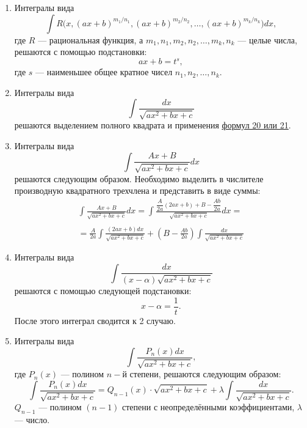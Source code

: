 \documentclass[a4paper,12pt,oneside]{extbook}
\theoremstyle{numbered}
\theoremstyle{unnumbered}
\theoremstyle{named}
\theoremstyle{unnumbered}
\theoremstyle{named}
\theoremstyle{named}
\theoremstyle{named}
\newcommand{\plink}[2]{\hyperref[#1]{\color{blue}\underline{#2}}}
\begin{document}
\begin{enumerate}
    \item {
          Интегралы вида
          \[
              \int R\Big(x, (ax + b)^{m_1 / n_1}, (ax + b)^{m_2 / n_2}, \ldots, (ax + b)^{m_k / n_k}\Big) dx,
          \]
          где \(R\) — рациональная функция, а \(m_1, n_1, m_2, n_2, \ldots, m_k, n_k\) — целые числа, решаются с помощью подстановки:
          \[
              ax + b = t^s,
          \]
          где \(s\) — наименьшее общее кратное чисел \(n_1, n_2, \ldots, n_k\).
          }
    \item {
          Интегралы вида
          \[
              \int \frac{dx}{\sqrt{ax^2 + bx + c}}
          \]
          решаются выделением полного квадрата и применения \plink{sub:Таблица основных интегралов}{формул 20 или 21}.
          }
    \item {
          Интегралы вида
          \[
              \int \frac{Ax + B}{\sqrt{ax^2 + bx + c}}dx
          \]
          решаются следующим образом. Необходимо выделить в числителе производную квадратного трехчлена и представить в виде суммы:
          \begin{equation}
              \begin{gathered}
                  \int \frac{Ax + B}{\sqrt{ax^2 + bx + c}}dx =
                  \int \frac{\dfrac{A}{2a}(2ax + b) + B - \dfrac{Ab}{2a}}{\sqrt{ax^2 + bx + c}} dx = \\ \\ =
                  \frac{A}{2a} \int \frac{(2ax + b) dx}{\sqrt{ax^2 + bx + c}} + (B - \frac{Ab}{2a}) \int \frac{dx}{\sqrt{ax^2 + bx + c}}
              \end{gathered}
          \end{equation}
          }
    \item {
          Интегралы вида
          \[
              \int \frac{dx}{(x - \alpha) \sqrt{ax^2 + bx + c}}
          \]
          решаются с помощью следующей подстановки:
          \[
              x - \alpha = \frac{1}{t}.
          \]
          После этого интеграл сводится к 2 случаю.
          }
    \item {
          Интегралы вида
          \[
              \int \frac{P_n(x) dx}{\sqrt{ax^2 + bx + c}},
          \]
          где \(P_n(x)\) — полином \(n-\text{й}\) степени, решаются следующим образом:
          \[
              \int \frac{P_n(x)dx}{\sqrt{ax^2 + bx + c}} = Q_{n - 1}(x) \cdot \sqrt{ax^2 + bx + c} + \lambda \int \frac{dx}{\sqrt{ax^2 + bx + c}}.
          \]
          \(Q_{n - 1}\) — полином \((n - 1)\) степени с неопределёнными коэффициентами, \(\lambda\) — число.
}
\end{enumerate}
\end{document}
